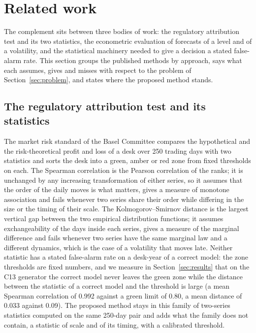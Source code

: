 \section{Related work}
\label{sec:related-work}

The complement sits between three bodies of work: the regulatory attribution test and its two statistics, the econometric evaluation of forecasts of a level and of a volatility, and the statistical machinery needed to give a decision a stated false-alarm rate.
This section groups the published methods by approach, says what each assumes, gives and misses with respect to the problem of Section~\ref{sec:problem}, and states where the proposed method stands.

\subsection{The regulatory attribution test and its statistics}
\label{sec:rw-regulatory}

The market risk standard of the Basel Committee \citep{bcbs2019,bcbs2016} compares the hypothetical and the risk-theoretical profit and loss of a desk over 250 trading days with two statistics and sorts the desk into a green, amber or red zone from fixed thresholds on each.
The Spearman correlation \citep{spearman1904} is the Pearson correlation of the ranks; it is unchanged by any increasing transformation of either series, so it assumes that the order of the daily moves is what matters, gives a measure of monotone association and fails whenever two series share their order while differing in the size or the timing of their scale.
The Kolmogorov--Smirnov distance \citep{smirnov1948} is the largest vertical gap between the two empirical distribution functions; it assumes exchangeability of the days inside each series, gives a measure of the marginal difference and fails whenever two series have the same marginal law and a different dynamics, which is the case of a volatility that moves late.
Neither statistic has a stated false-alarm rate on a desk-year of a correct model: the zone thresholds are fixed numbers, and we measure in Section~\ref{sec:results} that on the C13 generator the correct model never leaves the green zone while the distance between the statistic of a correct model and the threshold is large (a mean Spearman correlation of 0.992 against a green limit of 0.80, a mean distance of 0.033 against 0.09).
The proposed method stays in this family of two-series statistics computed on the same 250-day pair and adds what the family does not contain, a statistic of scale and of its timing, with a calibrated threshold.

